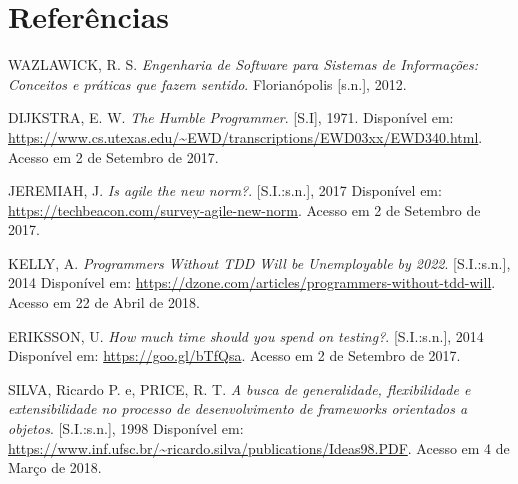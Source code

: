 \documentclass[
    12pt,       %
    openright,      %
    twoside,      %
    a4paper,      %
    english,      %
    french,       %
    spanish,      %
    brazil,       %
    ]{abntex2}
\begin{document}






  \postextual


  
  \chapter*{Referências}
  \noindent
  WAZLAWICK, R. S. \textit{Engenharia de Software para Sistemas de Informações: Conceitos e práticas que fazem sentido}. Florianópolis [s.n.], 2012.

  \noindent
  DIJKSTRA, E. W. \textit{The Humble Programmer}. [S.I], 1971. Disponível em:
  \url{https://www.cs.utexas.edu/~EWD/transcriptions/EWD03xx/EWD340.html}.
  Acesso em 2 de Setembro de 2017.

  \noindent
  JEREMIAH, J. \textit{Is agile the new norm?}. [S.I.:s.n.], 2017 Disponível em:
  \url{https://techbeacon.com/survey-agile-new-norm}. Acesso em 2 de Setembro de 2017.

  \noindent
  KELLY, A. \textit{Programmers Without TDD Will be Unemployable by 2022}. [S.I.:s.n.],
  2014 Disponível em: \url{https://dzone.com/articles/programmers-without-tdd-will}. Acesso em 22 de Abril de 2018.

  \noindent
  ERIKSSON, U. \textit{How much time should you spend on testing?}. [S.I.:s.n.], 2014 Disponível em:
  \url{https://goo.gl/bTfQsa}. Acesso em 2 de Setembro de 2017.

  \noindent
  SILVA, Ricardo P. e, PRICE, R. T. \textit{A busca de generalidade, flexibilidade e extensibilidade no processo de desenvolvimento de frameworks orientados a objetos}. [S.I.:s.n.], 1998 Disponível em: \url{https://www.inf.ufsc.br/~ricardo.silva/publications/Ideas98.PDF}. Acesso em 4 de Março de 2018.
\end{document}
